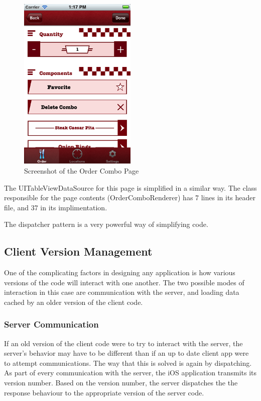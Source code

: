 \documentclass[se]{uw-wkrpt}
\begin{document}
\begin{figure}[h!]
  \caption{Screenshot of the Order Combo Page}
  \centering
    \includegraphics[width=0.5\textwidth]{orderComboPage}
\end{figure}

The UITableViewDataSource for this page is simplified in a similar way. The class responsible
for the page contents (OrderComboRenderer) has 7 lines in its header file, and 37 in its implimentation.


The dispatcher pattern is a very powerful way of simplifying code.

\subsection{Client Version Management}

One of the complicating factors in designing any application is how various versions of the code will
interact with one another. The two possible modes of interaction in this case are communication with
the server, and loading data cached by an older version of the client code. 

\subsubsection{Server Communication}

If an old version of the client code were to try to interact with the server, the server's behavior
may have to be different than if an up to date client app were to attempt communications. The way that
this is solved is again by dispatching. As part of every communication with the server, the iOS application
transmits its version number. Based on the version number, the server dispatches the the response behaviour
to the appropriate version of the server code.
\end{document}
